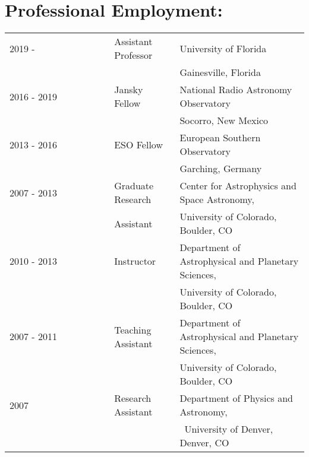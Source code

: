 \begin{minipage}{\textwidth}
\setlength{\extrarowheight}{2pt}
\section*{Professional Employment:}
\begin{listliketab}
    \begin{tabular}{lll}
    2019 -      & Assistant Professor & University of Florida \\
                                     && Gainesville, Florida \\
    2016 - 2019 & Jansky Fellow  & National Radio Astronomy Observatory\\
                 &         & Socorro, New Mexico \\
    2013 - 2016 & ESO Fellow  & European Southern Observatory\\
                 &         & Garching, Germany \\
    2007 - 2013 & Graduate Research & Center for Astrophysics and Space Astronomy, \\
              &   Assistant         & University of Colorado, Boulder, CO \\
    2010 - 2013 & Instructor  & Department of Astrophysical and Planetary Sciences, \\
                           && University of Colorado, Boulder, CO \\
    2007 - 2011    & Teaching Assistant & Department of Astrophysical and Planetary Sciences, \\
                                    && University of Colorado, Boulder, CO \\
    2007 & Research Assistant & Department of Physics and Astronomy, \\
                                          && University of Denver, Denver, CO \\
    \end{tabular}
\end{listliketab}

\end{minipage}
